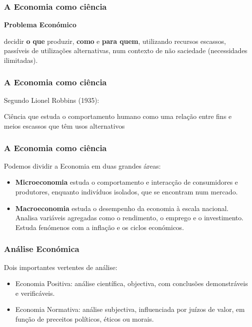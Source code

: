\begin{frame}
	\frametitle{A Economia como ci\^encia}

	\begin{center}
		\textbf{Problema Econ\'omico}
	\end{center}

	\vspace{0.2cm}

	\pause

	decidir \textbf{o que} produzir, \textbf{como} e \textbf{para quem}, utilizando recursos escassos, pass\'iveis de utiliza\c c\~oes alternativas, num contexto de n\~ao saciedade (necessidades ilimitadas).

\end{frame}

\begin{frame}
	\frametitle{A Economia como ci\^encia}
	Segundo Lionel Robbins (1935):

	\begin{tcolorbox}[colback=red!5,colframe=red!40!black,title=Economia]
		Ci\^encia que estuda o comportamento humano como uma rela\c c\~ao entre fins e meios escassos que t\^em usos alternativos
	\end{tcolorbox}

\end{frame}

\begin{frame}
	\frametitle{A Economia como ci\^encia}

	Podemos dividir a Economia em duas grandes \'areas:\pause

	\begin{itemize}
		\item \textbf{Microeconomia} estuda o comportamento e interac\c c\~ao de consumidores e produtores, enquanto indiv\'iduos isolados, que se encontram num mercado. \pause
		\item \textbf{Macroeconomia} estuda o desempenho da economia \`a escala nacional. Analisa vari\'aveis agregadas como o rendimento, o emprego e o investimento. Estuda fen\'omenos com a infla\c c\~ao e os ciclos econ\'omicos.
	\end{itemize}
\end{frame}

\begin{frame}
	\frametitle{An\'alise Econ\'omica}
	Dois importantes vertentes de an\'alise:\pause
	\begin{itemize}
		\item Economia Positiva: an\'alise cient\'ifica, objectiva, com conclus\~oes demonstr\'aveis e verific\'aveis.\pause
		\item Economia Normativa: an\'alise subjectiva, influenciada por ju\'izos de valor, em fun\c c\~ao de preceitos pol\'iticos, \'eticos ou morais.
	\end{itemize}
\end{frame}

